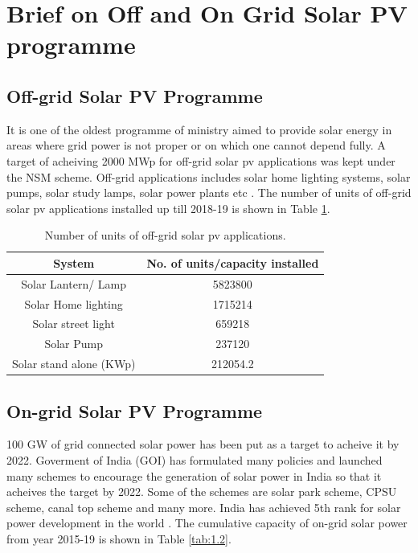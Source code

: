 \documentclass[a4paper,12pt]{iitmdiss}
\begin{document}
\section{Brief on Off and On Grid  Solar PV programme}
\subsection{Off-grid Solar PV Programme}
It is one of the oldest programme of ministry aimed to provide solar energy in areas where grid power is not proper or on which one cannot depend fully. A target of acheiving 2000 MWp for off-grid solar pv applications was kept under the NSM scheme. Off-grid applications includes solar home lighting systems, solar pumps, solar study lamps, solar power plants etc \textcolor{blue}{\cite{mnre}}. The number of units of off-grid solar pv applications installed up till 2018-19 is shown in Table \ref{tab:1.1}. 

 \begin{table}[hbt!]
    \centering
    \caption{Number of units of off-grid solar pv applications.}
    \label{tab:my_label}
    \begin{tabular}{|c|c|}
    \hline
    \textbf{System}  &\textbf{No. of units/capacity installed}  \\ \hline
    Solar Lantern/ Lamp & 5823800 \\ \hline
    			
    Solar Home lighting & 1715214 \\  \hline
    Solar street light & 659218 \\  \hline
    Solar Pump & 237120  \\  \hline
    Solar stand alone (KWp) & 212054.2 \\ \hline
\end{tabular}
\label{tab:1.1}
\end{table}



\subsection{On-grid Solar PV Programme}
100 GW  of grid connected solar power has been put as a target to acheive it by 2022. Goverment of India (GOI) has formulated many policies and launched many schemes to encourage the generation of solar power in India so that it acheives the target by 2022. Some of the schemes are solar park scheme, CPSU scheme, canal top scheme and many more. India has achieved 5th rank for solar power development in the world \textcolor{blue}{\cite{mnre1}}. The cumulative capacity of on-grid solar power from year 2015-19 is shown in Table \ref{tab:1.2}.
\end{document}
